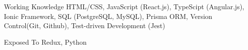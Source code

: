 

\begin{cvskills}

  \cvskill
    {Working Knowledge} %
    {HTML/CSS, JavaScript (React.js), TypeScipt (Angular.js), Ionic Framework, SQL (PostgreSQL, MySQL), Prisma ORM, Version Control(Git, Github), Test-driven Development (Jest)} %

  \cvskill
    {Exposed To} %
    {Redux, Python} %

\end{cvskills}
